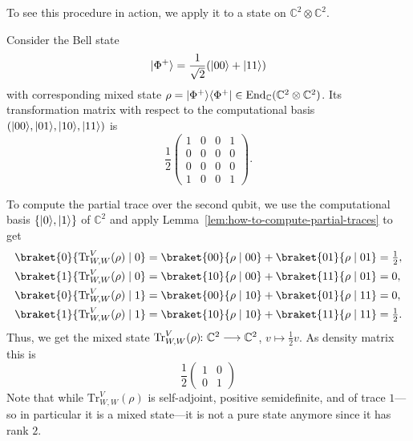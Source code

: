 \documentclass[a4paper, oneside, 12pt]{amsart}
\begin{document}
To see this procedure in action, we apply it to a  state on \( \mathbb{C}^{2}\otimes \mathbb{C}^{2}\).
\begin{example}
  Consider the Bell state
  \begin{equation*}
    \lvert\Phi^+\rangle = \frac{1}{\sqrt{2}}(\lvert00\rangle + \lvert11\rangle)
  \end{equation*}
  with corresponding mixed state \(\rho = \lvert\Phi^{+}\rangle\langle\Phi^{+}\rvert\in \operatorname{End}_{ \mathbb{C}}( \mathbb{C}^{2}\otimes \mathbb{C}^{2})\).
  Its transformation matrix with respect to the computational basis \((\lvert00\rangle, \lvert01\rangle, \lvert10\rangle, \lvert11\rangle)\) is
  \begin{equation*}
    \frac{1}{2}
    \begin{pmatrix}
      1 & 0 & 0 & 1 \\
      0 & 0 & 0 & 0 \\
      0 & 0 & 0 & 0 \\
      1 & 0 & 0 & 1
    \end{pmatrix}.
  \end{equation*}

  To compute the partial trace over the second qubit, we use the computational basis \(\{\lvert0\rangle, \lvert1\rangle\}\) of \( \mathbb{C}^{2}\) and apply Lemma~\ref{lem:how-to-compute-partial-traces} to get
  \begin{align*}
    \braket{0}{\mathrm{Tr}^{V}_{W,W}(\rho) \mid 0}
    & = \braket{00}{\rho \mid 00} + \braket{01}{\rho \mid 01}
      = \tfrac{1}{2}, \\
    \braket{1}{\mathrm{Tr}^{V}_{W,W}(\rho) \mid 0}
    & = \braket{10}{\rho \mid 00} + \braket{11}{\rho \mid 01}
      = 0, \\
    \braket{0}{\mathrm{Tr}^{V}_{W,W}(\rho) \mid 1}
    & = \braket{00}{\rho \mid 10} + \braket{01}{\rho \mid 11}
      = 0, \\
    \braket{1}{\mathrm{Tr}^{V}_{W,W}(\rho) \mid 1}
    & = \braket{10}{\rho \mid 10} + \braket{11}{\rho \mid 11}
      = \tfrac{1}{2}.
  \end{align*}
  Thus, we get the mixed state \(\mathrm{Tr}^{V}_{W,W}(\rho) \from \mathbb{C}^{2}\to \mathbb{C}^{2}\), \(v\mapsto \tfrac{1}{2} v\).
  As density matrix this is
  \begin{equation*}
    \frac{1}{2}
    \begin{pmatrix}
      1 & 0 \\
      0 & 1
    \end{pmatrix}
  \end{equation*}
  Note that while \(\mathrm{Tr}^{V}_{W,W}(\rho)\) is self-adjoint, positive semidefinite, and of trace \(1\)---so in particular it is a mixed state---it is not a pure state anymore since it has rank \(2\).
\end{example}
\end{document}
